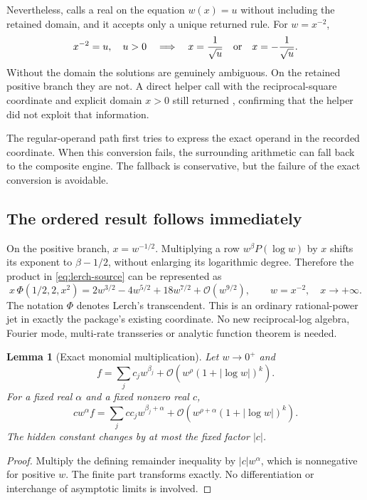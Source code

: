 \documentclass[11pt,a4paper]{article}
\newcommand{\code}[1]{\texttt{\detokenize{#1}}}
\newcommand{\OO}{\mathcal O}
\newtheorem{lemma}[proposition]{Lemma}
\begin{document}
Nevertheless, \code{seriesCoordinateRule} calls a real \code{Solve} on the equation $w(x)=u$ without including the retained domain, and it accepts only a unique returned rule. For $w=x^{-2}$,
\begin{equation}
 x^{-2}=u,\quad u>0
 \quad\Longrightarrow\quad
 x=\frac{1}{\sqrt u}\quad\hbox{or}\quad x=-\frac{1}{\sqrt u}.
 \label{eq:two-charts}
\end{equation}
Without the domain the solutions are genuinely ambiguous. On the retained positive branch they are not. A direct helper call with the reciprocal-square coordinate and explicit domain $x>0$ still returned \code{$Failed}, confirming that the helper did not exploit that information.\cite{operations-source}

The regular-operand path first tries to express the exact operand in the recorded coordinate. When this conversion fails, the surrounding arithmetic can fall back to the composite engine. The fallback is conservative, but the failure of the exact conversion is avoidable.\cite{arithmetic-source,envelope-source}

\subsection{The ordered result follows immediately}
On the positive branch, $x=w^{-1/2}$. Multiplying a row $w^\beta P(\log w)$ by $x$ shifts its exponent to $\beta-1/2$, without enlarging its logarithmic degree. Therefore the product in \eqref{eq:lerch-source} can be represented as
\begin{equation}
 x\,\Phi(1/2,2,x^2)
 =2w^{3/2}-4w^{5/2}+18w^{7/2}
  +\OO(w^{9/2}),\qquad w=x^{-2},\quad x\to+\infty.
 \label{eq:lerch-product-ordered}
\end{equation}
The notation $\Phi$ denotes Lerch's transcendent. This is an ordinary rational-power jet in exactly the package's existing coordinate. No new reciprocal-log algebra, Fourier mode, multi-rate transseries or analytic function theorem is needed.

\begin{lemma}[Exact monomial multiplication]
Let $w\to0^+$ and
\[
 f=\sum_j c_j w^{\beta_j}+\OO\!\left(w^\rho(1+|\log w|)^k\right).
\]
For a fixed real $\alpha$ and a fixed nonzero real $c$,
\[
 cw^\alpha f=\sum_j cc_j w^{\beta_j+\alpha}
 +\OO\!\left(w^{\rho+\alpha}(1+|\log w|)^k\right).
\]
The hidden constant changes by at most the fixed factor $|c|$.
\end{lemma}
\begin{proof}
Multiply the defining remainder inequality by $|c|w^\alpha$, which is nonnegative for positive $w$. The finite part transforms exactly. No differentiation or interchange of asymptotic limits is involved.
\end{proof}
\end{document}
